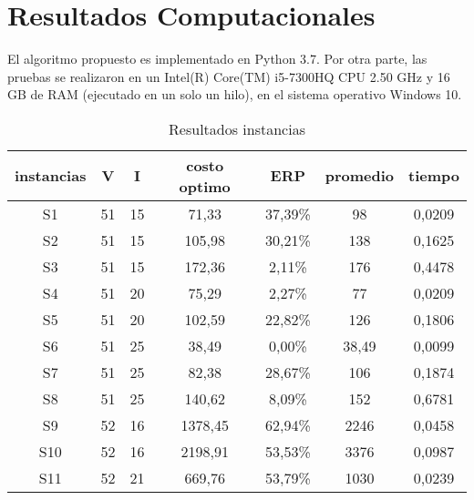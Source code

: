 \documentclass[11pt]{article}
\begin{document}
\section{Resultados Computacionales}
El algoritmo propuesto es implementado en Python 3.7. Por otra parte, las pruebas se realizaron en un Intel(R) Core(TM) i5-7300HQ CPU 2.50 GHz y 16 GB de RAM
(ejecutado en un solo un hilo), en el sistema operativo Windows 10.

\begin{table}[H]
\centering
\caption{Resultados instancias}
\label{tab:my-table}
\begin{tabular}{|c|c|c|c|c|c|c|}
\hline
\textbf{instancias} & \textbf{V} & \textbf{I} & \textbf{costo optimo} & \textbf{ERP} & \textbf{promedio} & \textbf{tiempo} \\ \hline
S1                  & 51         & 15         & 71,33                 & 37,39\%      & 98                & 0,0209          \\ \hline
S2                  & 51         & 15         & 105,98                & 30,21\%      & 138               & 0,1625          \\ \hline
S3                  & 51         & 15         & 172,36                & 2,11\%       & 176               & 0,4478          \\ \hline
S4                  & 51         & 20         & 75,29                 & 2,27\%       & 77                & 0,0209          \\ \hline
S5                  & 51         & 20         & 102,59                & 22,82\%      & 126               & 0,1806          \\ \hline
S6                  & 51         & 25         & 38,49                 & 0,00\%       & 38,49             & 0,0099          \\ \hline
S7                  & 51         & 25         & 82,38                 & 28,67\%      & 106               & 0,1874          \\ \hline
S8                  & 51         & 25         & 140,62                & 8,09\%       & 152               & 0,6781          \\ \hline
S9                  & 52         & 16         & 1378,45               & 62,94\%      & 2246              & 0,0458          \\ \hline
S10                 & 52         & 16         & 2198,91               & 53,53\%      & 3376              & 0,0987          \\ \hline
S11                 & 52         & 21         & 669,76                & 53,79\%      & 1030              & 0,0239          \\ \hline

\end{tabular}
\end{table}
\end{document}
